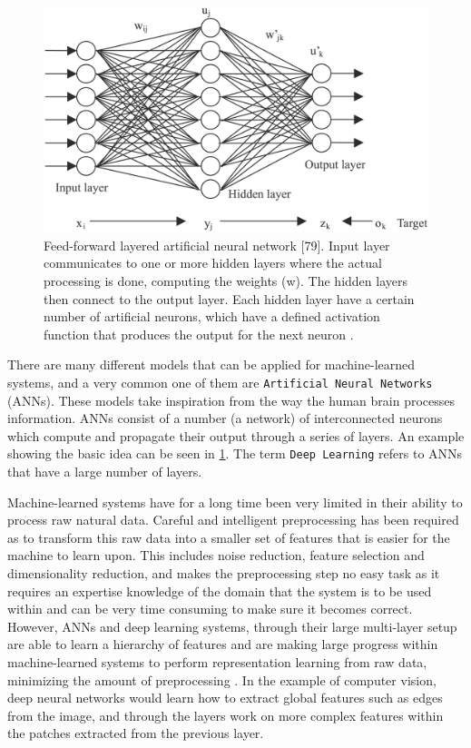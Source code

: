 \begin{figure}
	\centering
	\includegraphics[width=\textwidth]{img/related-work/ann.png}
	\caption{Feed-forward layered artificial neural network [79]. Input layer communicates to
one or more hidden layers where the actual processing is done, computing the weights (w). The
hidden layers then connect to the output layer. Each hidden layer have a certain number of
artificial neurons, which have a defined activation function that produces the output for the
next neuron \parencite{extremetech}.}
	\label{fig:rel_ann}
\end{figure}

There are many different models that can be applied for machine-learned systems, and a very common one of them are \texttt{Artificial Neural Networks} (ANNs). These models take inspiration from the way the human brain processes information. ANNs consist of a number (a network) of interconnected neurons which compute and propagate their output through a series of layers. An example showing the basic idea can be seen in \ref{fig:rel_ann}. The term \texttt{Deep Learning} refers to ANNs that have a large number of layers.

Machine-learned systems have for a long time been very limited in their ability to process raw natural data. Careful and intelligent preprocessing has been required as to transform this raw data into a smaller set of features that is easier for the machine to learn upon. This includes noise reduction, feature selection and dimensionality reduction, and makes the preprocessing step no easy task as it requires an expertise knowledge of the domain that the system is to be used within and can be very time consuming to make sure it becomes correct. However, ANNs and deep learning systems, through their large multi-layer setup are able to learn a hierarchy of features and are making large progress within machine-learned systems to perform representation learning from raw data, minimizing the amount of preprocessing \parencite{Lecun2015}. In the example of computer vision, deep neural networks would learn how to extract global features such as edges from the image, and through the layers work on more complex features within the patches extracted from the previous layer.

